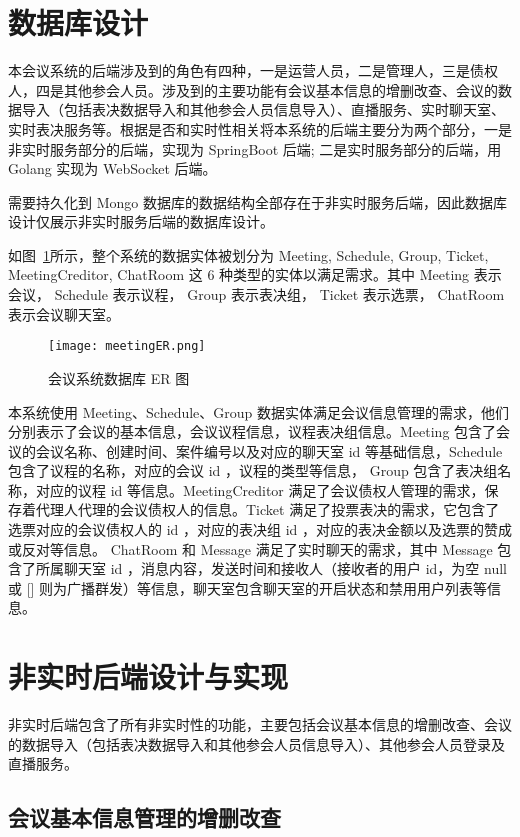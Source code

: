 \section{数据库设计}

本会议系统的后端涉及到的角色有四种，一是运营人员，二是管理人，三是债权人，四是其他参会人员。涉及到的主要功能有会议基本信息的增删改查、会议的数据导入（包括表决数据导入和其他参会人员信息导入）、直播服务、实时聊天室、实时表决服务等。根据是否和实时性相关将本系统的后端主要分为两个部分，一是非实时服务部分的后端，实现为 SpringBoot 后端; 二是实时服务部分的后端，用 Golang 实现为 WebSocket 后端。

需要持久化到 Mongo 数据库的数据结构全部存在于非实时服务后端，因此数据库设计仅展示非实时服务后端的数据库设计。

如图~\ref{fig:meetingER}所示，整个系统的数据实体被划分为 Meeting, Schedule,
Group, Ticket, MeetingCreditor, ChatRoom 这 6 种类型的实体以满足需求。其中 Meeting 表示会议， Schedule 表示议程， Group 表示表决组， Ticket 表示选票， ChatRoom 表示会议聊天室。

\begin{figure}[!htp]
    \centering
    \texttt{[image: meetingER.png]}
    \caption{会议系统数据库 ER 图}
    \label{fig:meetingER}
  \end{figure}

本系统使用 Meeting、Schedule、Group 数据实体满足会议信息管理的需求，他们分别表示了会议的基本信息，会议议程信息，议程表决组信息。Meeting 包含了会议的会议名称、创建时间、案件编号以及对应的聊天室 id 等基础信息，Schedule 包含了议程的名称，对应的会议 id ，议程的类型等信息， Group 包含了表决组名称，对应的议程 id 等信息。MeetingCreditor 满足了会议债权人管理的需求，保存着代理人代理的会议债权人的信息。Ticket 满足了投票表决的需求，它包含了选票对应的会议债权人的 id ，对应的表决组 id ，对应的表决金额以及选票的赞成或反对等信息。 ChatRoom 和 Message 满足了实时聊天的需求，其中 Message 包含了所属聊天室 id ，消息内容，发送时间和接收人（接收者的用户 id，为空 null 或 [] 则为广播群发）等信息，聊天室包含聊天室的开启状态和禁用用户列表等信息。

\section{非实时后端设计与实现}
非实时后端包含了所有非实时性的功能，主要包括会议基本信息的增删改查、会议的数据导入（包括表决数据导入和其他参会人员信息导入）、其他参会人员登录及直播服务。


\subsection{会议基本信息管理的增删改查}
